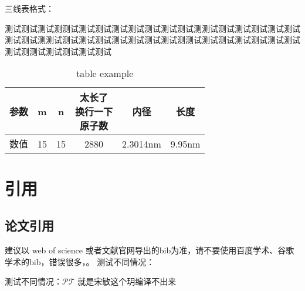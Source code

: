 \documentclass[AutoFakeBold]{LZUThesis-PgD&PhD}
\begin{document}
三线表格式：

测试测试测试测测试测试测试测试测试测试测试测试测测试测试测试测试测试测试测试测试测测试测试测试测试测试测试测试测试测测试测试测试测试测试测试测试测试测测试测试测试测试测试


\begin{table}[hbt!]\label{tbl:mole}
    \centering
    \begin{tabular*}{0.9\textwidth}{@{\extracolsep{\fill}}cccccc}
        \toprule
        参数& m & n & \tabincell{c}{太长了\\换行一下\\原子数}  & 内径 & 长度\\
        \midrule
        数值 & 15 & 15  & 2880 & 2.3014nm & 9.95nm \\
        \bottomrule
    \end{tabular*}
    \caption{table example}
\end{table}


\section{引用}

\subsection{论文引用}

建议以 web of science 或者文献官网导出的bib为准，请不要使用百度学术、谷歌学术的bib，错误很多，\cite{partl2016, tenne1992polyhedral, tussyadiah2015hotels}。
测试不同情况：

测试不同情况：$\mathcal{P}\mathcal{T}$ 就是宋敏这个玥编译不出来
\end{document}
